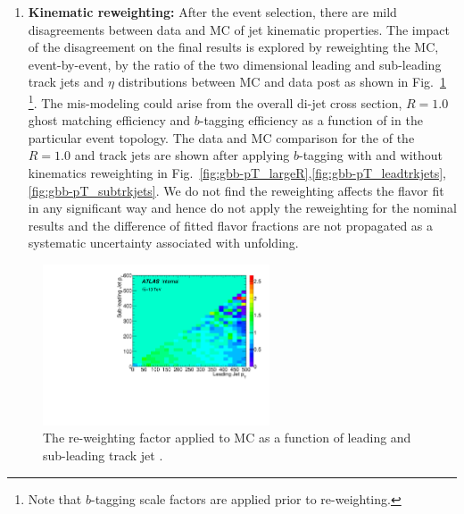 \begin{enumerate}
  \item \textbf{Kinematic reweighting:} After the event selection, there are mild disagreements between data and MC of jet kinematic properties. The impact of the disagreement on the final results is explored by reweighting the MC, event-by-event, by the ratio of the two dimensional leading and sub-leading track jets \pt and $\eta$ distributions between MC and data post \btagging as shown in Fig.~\ref{fig:gbb-reweightmap} \footnote {Note that $b$-tagging scale factors are applied prior to re-weighting.}. The mis-modeling could arise from the overall di-jet cross section, $R=1.0$ ghost matching efficiency and $b$-tagging efficiency as a function of \pt in the particular event topology. The data and MC comparison for the \pt of the $R=1.0$ and track jets are shown after applying $b$-tagging with and without kinematics reweighting in Fig.~\ref{fig:gbb-pT_largeR},\ref{fig:gbb-pT_leadtrkjets},\ref{fig:gbb-pT_subtrkjets}. We do not find the reweighting affects the flavor fit in any significant way and hence do not apply the reweighting for the nominal results and the difference of fitted flavor fractions are not propagated as a systematic uncertainty associated with unfolding.


\end{enumerate}

\begin{figure}[htbp]
  \centering
 \includegraphics[width=0.6\textwidth]{figures/gbb/pTReweightMap.pdf}
\caption{The re-weighting factor applied to MC as a function of leading and sub-leading track jet \pt.}
  \label{fig:gbb-reweightmap}
\end{figure}


